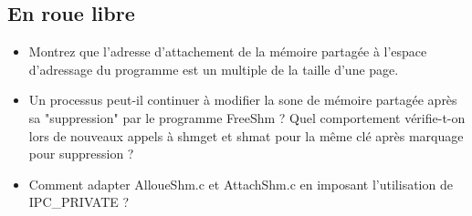 \subsection{En roue libre}
\begin{itemize}
\item Montrez que l'adresse d'attachement de la mémoire partagée à l'espace d'adressage du programme est un multiple de la taille d'une page.
\item Un processus peut-il continuer à modifier la sone de mémoire partagée après sa "suppression" par le programme FreeShm ? Quel comportement vérifie-t-on lors de nouveaux appels à shmget et shmat pour la même clé après marquage pour suppression ?
\item Comment adapter AlloueShm.c et AttachShm.c en imposant l'utilisation de IPC\_PRIVATE ?
\end{itemize}
\newpage
